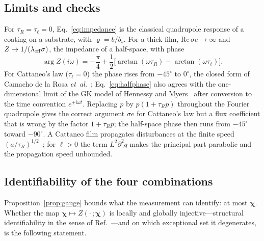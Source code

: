\subsection{Limits and checks}\label{sec:ff-limits}

For $\tau_R=\tau_\ell=0$, Eq.~\eqref{eq:impedance} is the classical quadrupole response of a coating
on a substrate, with $\varrho=b/b_s$. For a thick film, $\mathrm{Re}\,\sigma e\to\infty$ and
$Z\to1/(\lambda_{\rm eff}\sigma)$, the impedance of a half-space, with phase
\begin{equation}
\arg Z(i\omega)=-\frac\pi4+\frac12\big[\arctan(\omega\tau_R)-\arctan(\omega\tau_\ell)\big].
\label{eq:halfphase}
\end{equation}
For Cattaneo's law ($\tau_\ell=0$) the phase rises from $-45^\circ$ to $0^\circ$, the closed form of
Camacho de la Rosa \emph{et~al.}~\cite{CamachoDeLaRosa2025}; Eq.~\eqref{eq:halfphase} also agrees with
the one-dimensional limit of the GK model of Hennessy and Myers~\cite{HennessyMyers2021} after
conversion to the time convention $e^{+i\omega t}$. Replacing $p$ by $p(1+\tau_Rp)$ throughout the
Fourier quadrupole gives the correct argument $\sigma e$ for Cattaneo's law but a flux coefficient that
is wrong by the factor $1+\tau_Rp$; the half-space phase then runs from $-45^\circ$ toward $-90^\circ$.
A Cattaneo film propagates disturbances at the finite speed $(a/\tau_R)^{1/2}$~\cite{JosephPreziosi1989};
for $\ell>0$ the term $L^2\partial_z^2q$ makes the principal part parabolic and the propagation speed
unbounded.

\subsection{Identifiability of the four combinations}\label{sec:rank}

Proposition~\ref{prop:gauge} bounds what the measurement can identify: at most $\bm\chi$. Whether the
map $\bm\chi\mapsto Z(\cdot\,;\bm\chi)$ is locally and globally injective---structural identifiability in
the sense of Ref.~\cite{Raue2009}---and on which exceptional set it degenerates, is the following
statement.

